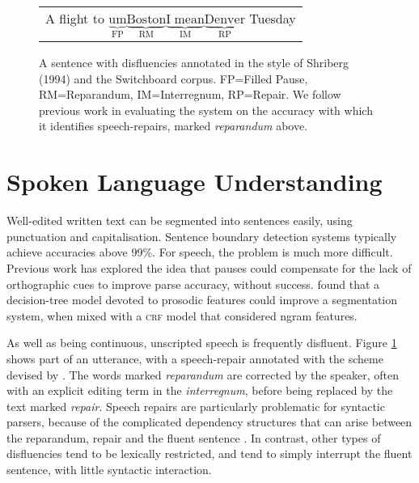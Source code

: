 \documentclass[11pt,letterpaper]{article}
\begin{document}
\begin{figure}
    \begin{tabular}{l}

        A flight to $\underbrace{\mathrm{um}}_\text{FP} \underbrace{\mathrm{Boston}}_\text{RM} \underbrace{\mathrm{I\;mean}}_\text{IM} \underbrace{\mathrm{Denver}}_\text{RP}$ Tuesday\\

\end{tabular}
\caption{\small A sentence with disfluencies annotated in the style of Shriberg (1994) 
    and the Switchboard corpus.
FP=Filled Pause, RM=Reparandum, IM=Interregnum, RP=Repair.
We follow previous work in evaluating the system on the accuracy with which
it identifies speech-repairs, marked \emph{reparandum} above.
\label{fig:shriberg}}
\end{figure}


\section{Spoken Language Understanding}


Well-edited written text can be segmented into sentences easily, using punctuation and
capitalisation.  Sentence boundary detection systems typically achieve accuracies
above 99\%.  For speech, the problem is much more difficult.  Previous work has
explored the idea that pauses could compensate
for the lack of orthographic cues \citep{gregory:04} to improve parse accuracy,
without success.  \citet{liu:05} found that a decision-tree model devoted to prosodic
features could improve a segmentation system, when mixed with a \textsc{crf} model that
considered ngram features.

As well as being continuous, unscripted speech is frequently disfluent.
Figure \ref{fig:shriberg} shows part of an utterance, with a speech-repair annotated
with the scheme devised by \citet{shriberg:94}.  The words marked \emph{reparandum}
are corrected by the speaker, often with an explicit editing term in the
\emph{interregnum}, before being replaced by the text marked \emph{repair}.
Speech repairs are particularly problematic for syntactic
parsers, because of the complicated dependency structures that can arise between the
reparandum, repair and the fluent sentence \citep{Johnson04a}.
In contrast, other types of disfluencies tend to be lexically restricted, and
tend to simply interrupt the fluent sentence, with little syntactic interaction.
\end{document}
